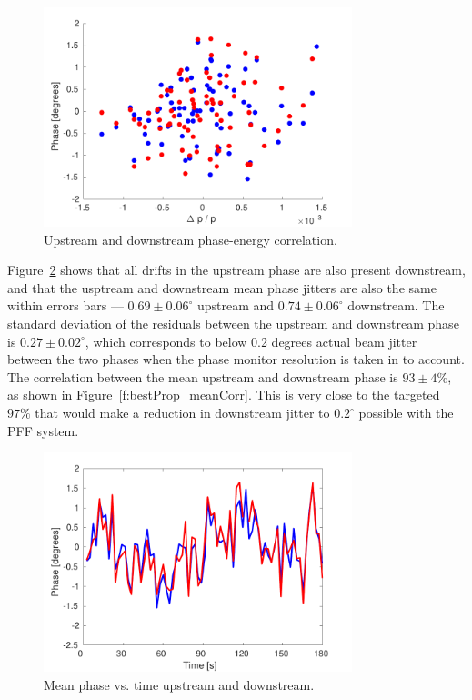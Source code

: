 \begin{figure}
  \centering
  \includegraphics[width=0.8\textwidth]{Figures/propagation/bestProp_enCorr}
  \caption{Upstream and downstream phase-energy correlation.}
  \label{f:bestProp_enCorr}
\end{figure}

Figure~\ref{f:bestProp_meanPhase} shows that all drifts in the upstream phase are also present downstream, and that the usptream and downstream mean phase jitters are also the same within errors bars --- \(0.69\pm0.06^\circ\) upstream and \(0.74\pm0.06^\circ\) downstream. The standard deviation of the residuals between the upstream and downstream phase is \(0.27\pm0.02^\circ\), which corresponds to below 0.2 degrees actual beam jitter between the two phases when the phase monitor resolution is taken in to account. The correlation between the mean upstream and downstream phase is \(93\pm4\%\), as shown in Figure~\ref{f:bestProp_meanCorr}. This is very close to the targeted \(97\%\) that would make a reduction in downstream jitter to \(0.2^\circ\) possible with the PFF system.

\begin{figure}
  \centering
  \includegraphics[width=0.8\textwidth]{Figures/propagation/bestProp_meanPhase}
  \caption{Mean phase vs. time upstream and downstream.}
  \label{f:bestProp_meanPhase}
\end{figure}

